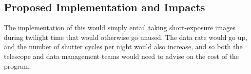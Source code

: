 \subsection{Proposed Implementation and Impacts}

The implementation of this would simply entail taking short-exposure
images during twilight time that would otherwise go unused. The data
rate would go up, and the number of shutter cycles per night would also
increase, and so both the telescope and data management teams would need to advise on the cost of the program.

%
%

